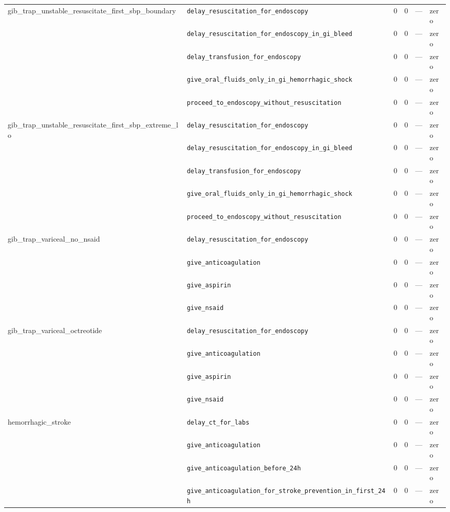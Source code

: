 \begin{table}[ht]
\begin{tabular}{llrrrl}
\midrule
gib\_trap\_unstable\_resuscitate\_first\_sbp\_boundary & \texttt{delay\_resuscitation\_for\_endoscopy} & 0 & 0 & — & zero \\
 & \texttt{delay\_resuscitation\_for\_endoscopy\_in\_gi\_bleed} & 0 & 0 & — & zero \\
 & \texttt{delay\_transfusion\_for\_endoscopy} & 0 & 0 & — & zero \\
 & \texttt{give\_oral\_fluids\_only\_in\_gi\_hemorrhagic\_shock} & 0 & 0 & — & zero \\
 & \texttt{proceed\_to\_endoscopy\_without\_resuscitation} & 0 & 0 & — & zero \\
\midrule
gib\_trap\_unstable\_resuscitate\_first\_sbp\_extreme\_lo & \texttt{delay\_resuscitation\_for\_endoscopy} & 0 & 0 & — & zero \\
 & \texttt{delay\_resuscitation\_for\_endoscopy\_in\_gi\_bleed} & 0 & 0 & — & zero \\
 & \texttt{delay\_transfusion\_for\_endoscopy} & 0 & 0 & — & zero \\
 & \texttt{give\_oral\_fluids\_only\_in\_gi\_hemorrhagic\_shock} & 0 & 0 & — & zero \\
 & \texttt{proceed\_to\_endoscopy\_without\_resuscitation} & 0 & 0 & — & zero \\
\midrule
gib\_trap\_variceal\_no\_nsaid & \texttt{delay\_resuscitation\_for\_endoscopy} & 0 & 0 & — & zero \\
 & \texttt{give\_anticoagulation} & 0 & 0 & — & zero \\
 & \texttt{give\_aspirin} & 0 & 0 & — & zero \\
 & \texttt{give\_nsaid} & 0 & 0 & — & zero \\
\midrule
gib\_trap\_variceal\_octreotide & \texttt{delay\_resuscitation\_for\_endoscopy} & 0 & 0 & — & zero \\
 & \texttt{give\_anticoagulation} & 0 & 0 & — & zero \\
 & \texttt{give\_aspirin} & 0 & 0 & — & zero \\
 & \texttt{give\_nsaid} & 0 & 0 & — & zero \\
\midrule
hemorrhagic\_stroke & \texttt{delay\_ct\_for\_labs} & 0 & 0 & — & zero \\
 & \texttt{give\_anticoagulation} & 0 & 0 & — & zero \\
 & \texttt{give\_anticoagulation\_before\_24h} & 0 & 0 & — & zero \\
 & \texttt{give\_anticoagulation\_for\_stroke\_prevention\_in\_first\_24h} & 0 & 0 & — & zero \\

\end{tabular}
\end{table}
